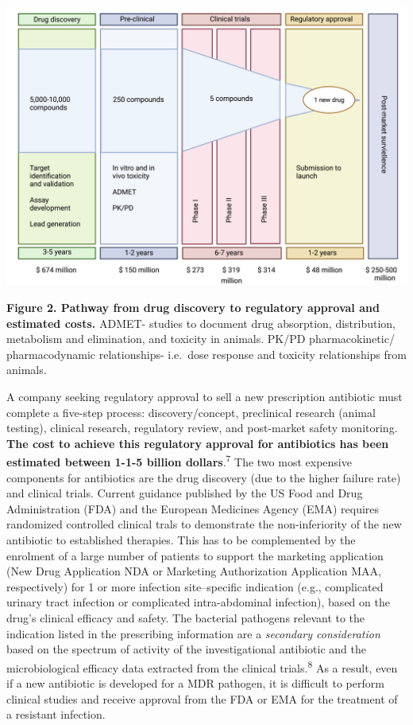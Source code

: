 \documentclass[
]{book}
\begin{document}
\includegraphics[width=8.33333in,height=\textheight]{images/clinical trial.png}

\textbf{Figure 2. Pathway from drug discovery to regulatory approval and estimated costs.} ADMET- studies to document drug absorption, distribution, metabolism and elimination, and toxicity in animals. PK/PD pharmacokinetic/ pharmacodynamic relationships- i.e.~dose response and toxicity relationships from animals.

A company seeking regulatory approval to sell a new prescription antibiotic must complete a five-step process: discovery/concept, preclinical research (animal testing), clinical research, regulatory review, and post-market safety monitoring. \textbf{The cost to achieve this regulatory approval for antibiotics has been estimated between 1-1-5 billion dollars}.\textsuperscript{7} The two most expensive components for antibiotics are the drug discovery (due to the higher failure rate) and clinical trials. Current guidance published by the US Food and Drug Administration (FDA) and the European Medicines Agency (EMA) requires randomized controlled clinical trals to demonstrate the non-inferiority of the new antibiotic to established therapies. This has to be complemented by the enrolment of a large number of patients to support the marketing application (New Drug Application NDA or Marketing Authorization Application MAA, respectively) for 1 or more infection site--specific indication (e.g., complicated urinary tract infection or complicated intra-abdominal infection), based on the drug's clinical efficacy and safety. The bacterial pathogens relevant to the indication listed in the prescribing information are a \emph{secondary consideration} based on the spectrum of activity of the investigational antibiotic and the microbiological efficacy data extracted from the clinical trials.\textsuperscript{8} As a result, even if a new antibiotic is developed for a MDR pathogen, it is difficult to perform clinical studies and receive approval from the FDA or EMA for the treatment of a resistant infection.
\end{document}
